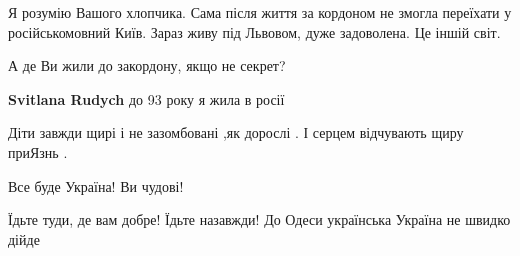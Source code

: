 \begin{itemize}
 

Я розумію Вашого хлопчика. Сама після життя за кордоном не змогла переїхати у
російськомовний Київ. Зараз живу під Львовом, дуже задоволена. Це іншій світ.

\begin{itemize}
 
А де Ви жили до закордону, якщо не секрет?

 
\textbf{Svitlana Rudych} до 93 року я жила в росії
\end{itemize}

 
Діти завжди щирі і не зазомбовані ,як дорослі .
І серцем відчувають щиру приЯзнь .

 
Все буде Україна! Ви чудові!

 
Їдьте туди, де вам добре! Їдьте назавжди! До Одеси українська Україна не швидко дійде


\end{itemize}
